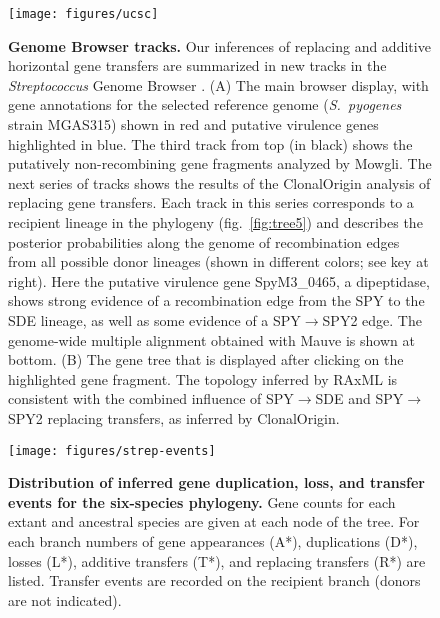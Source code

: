 \documentclass[12pt]{article}
\begin{document}
\begin{figure}[!ht]
\texttt{[image: figures/ucsc]}
\caption{ {\bf Genome Browser tracks.}  Our inferences of replacing and
  additive horizontal gene transfers are summarized in new tracks in the
  {\em Streptococcus} Genome Browser \citep{Suzuki2011}.  (A) The main
  browser display, with gene annotations for the selected reference genome
  ({\em S.\ pyogenes} strain MGAS315) shown in red and putative virulence
  genes highlighted in blue. The third track from top (in black) shows the
  putatively non-recombining gene fragments analyzed by Mowgli.  The next series
  of tracks shows the results of the ClonalOrigin analysis of
  replacing gene transfers.  Each track in this series corresponds to a
  recipient lineage in the phylogeny (fig.\ \ref{fig:tree5}) and describes
  the posterior probabilities along the genome of recombination edges from
  all possible donor lineages (shown in different colors; see key at
  right).  Here the putative virulence gene SpyM3\_0465, a dipeptidase,
  shows strong evidence of a recombination edge from the SPY to the 
  SDE lineage, as well as some evidence of a SPY$\rightarrow$SPY2 edge.
  The genome-wide multiple alignment obtained with Mauve is shown at
  bottom.  (B) The gene tree that is displayed after clicking on the
  highlighted gene fragment.  The topology inferred by RAxML is consistent
  with the combined influence of SPY$\rightarrow$SDE and
  SPY$\rightarrow$SPY2 replacing transfers, as inferred by ClonalOrigin.}
\label{fig:ucsc}
\end{figure}
\clearpage{}%

\begin{figure}
\texttt{[image: figures/strep-events]}
\caption{\label{fig:Gene-duplication-loss} 
{\bf Distribution of inferred gene duplication, loss, and transfer events
  for the six-species phylogeny.}  Gene counts for
each extant and ancestral species are given at each node of the tree.  For
each branch numbers of gene appearances (A*), duplications (D*), 
losses (L*), additive transfers (T*), and replacing transfers (R*) are listed.
Transfer events are recorded on the recipient branch (donors
are not indicated).}
\end{figure}
\clearpage{}%
\end{document}
